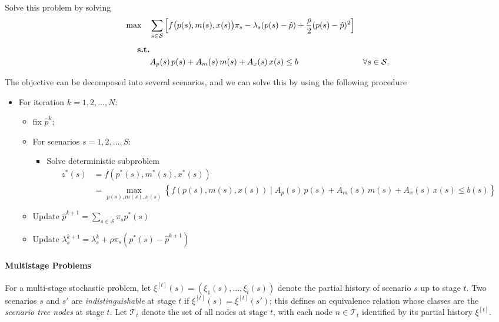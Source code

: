 \documentclass[trsc,nonblindrev]{informs3noheader}
\begin{document}
Solve this problem by solving
\begin{align}
    \mathbf{\max} \quad
    &\sum_{s\in \mathcal{S}} \left[
    f\big(p(s),m(s),x(s)\big)\pi_s -\lambda_s(p(s)-\hat{p}) + {\rho\over2}(p(s)-\hat{p})^2
    \right]\\[4pt]
    \textbf{s.t.}\nonumber\\
    & A_p(s)\,p(s) + A_m(s)\, m(s) + A_x(s)\,x(s) \le b \label{constraints} & \forall s\in \mathcal{S}.
\end{align}

The objective can be decomposed into several scenarios, and we can solve this by using the following procedure
\begin{itemize}
    \item For iteration $k=1,2,...,N$:
    \begin{itemize}
        \item fix $\hat{p}^{k}$;
        \item For scenarios $s=1,2,...,S$:
        \begin{itemize}
            \item Solve deterministic subproblem
            \begin{align*}z^*(s)&=f(p^*(s),m^*(s),x^*(s))\\
            &=\max_{p(s),m(s),x(s)}
            \left\{
            f(p(s),m(s),x(s))\mid A_p(s)\,p(s) + A_m(s)\, m(s) + A_x(s)\,x(s) \le b(s)
            \right\}
            \end{align*}
        \end{itemize}
        \item Update $\hat{p}^{k+1}=\sum_{s\in \mathcal{S}}\pi_s p^*(s)$
        \item Update $\lambda_s^{k+1} = \lambda_s^{k} + \rho\pi_s (p^*(s)-\hat{p}^{k+1})$
    \end{itemize}
\end{itemize}

\paragraph{Multistage Problems} For a multi-stage stochastic problem, let $\xi^{[t]}(s) = 
(\xi_1(s),\ldots,\xi_t(s))$ denote the partial history of scenario 
$s$ up to stage $t$. Two scenarios $s$ and $s'$ are 
\emph{indistinguishable} at stage $t$ if $\xi^{[t]}(s)=\xi^{[t]}(s')$; 
this defines an equivalence relation whose classes are the 
\emph{scenario tree nodes} at stage $t$. Let $\mathcal{T}_t$ denote 
the set of all nodes at stage $t$, with each node $n\in\mathcal{T}_t$ 
identified by its partial history $\xi^{[t]}$.
\end{document}
